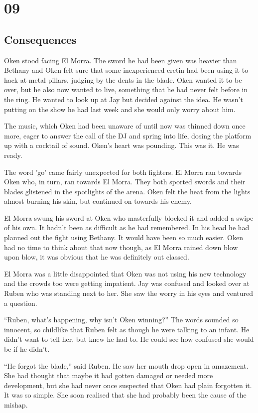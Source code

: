 \chapter{09}
\section{Consequences}


Oken stood facing El Morra.  The sword he had been given was heavier than Bethany and Oken felt sure that some inexperienced cretin had been using it to hack at metal pillars, judging by the dents in the blade.  Oken wanted it to be over, but he also now wanted to live, something that he had never felt before in the ring.  He wanted to look up at Jay but decided against the idea.  He wasn't putting on the show he had last week and she would only worry about him.

The music, which Oken had been unaware of until now was thinned down once more, eager to answer the call of the DJ and spring into life, dosing the platform up with a cocktail of sound.  Oken's heart was pounding.  This was it.  He was ready.

The word 'go' came fairly unexpected for both fighters.  El Morra ran towards Oken who, in turn, ran towards El Morra.  They both sported swords and their blades glistened in the spotlights of the arena.  Oken felt the heat from the lights almost burning his skin, but continued on towards his enemy.  

El Morra swung his sword at Oken who masterfully blocked it and added a swipe of his own.  It hadn't been as difficult as he had remembered.  In his head he had planned out the fight using Bethany.  It would have been so much easier.  Oken had no time to think about that now though, as El Morra rained down blow upon blow, it was obvious that he was definitely out classed.

El Morra was a little disappointed that Oken was not using his new technology and the crowds too were getting impatient.  Jay was confused and looked over at Ruben who was standing next to her.  She saw the worry in his eyes and ventured a question.

``Ruben, what's happening, why isn't Oken winning?''  The words sounded so innocent, so childlike that Ruben felt as though he were talking to an infant.  He didn't want to tell her, but knew he had to.  He could see how confused she would be if he didn't.

``He forgot the blade,'' said Ruben.  He saw her mouth drop open in amazement.  She had thought that maybe it had gotten damaged or needed more development, but she had never once suspected that Oken had plain forgotten it.  It was so simple.  She soon realised that she had probably been the cause of the mishap.  

